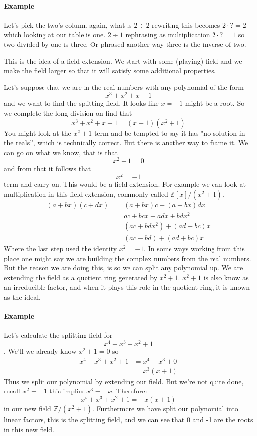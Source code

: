 \documentclass[12pt]{article}
\begin{document}
\paragraph*{Example} Let's pick the two's column again, what is $2 \div 2$ rewriting this becomes $2 \cdot ? = 2$ which looking at our table is one.   $2 \div 1$ rephrasing as multiplication $2 \cdot ? = 1$ so two divided by one is three. Or phrased another way three is the inverse of two.

This is the idea of a field extension.  We start with some (playing) field and we make the field larger so that it will satisfy some additional properties.  

Let's suppose that we are in the real numbers with any polynomial of the form $$x^3+x^2+x+1$$ and we want to find the splitting field.  It looks like $x=-1$ might be a root. So we complete the long division on find that
$$x^3+x^2+x+1 = (x+1)(x^2+1)$$ 
You might look at the $x^2+1$ term and be tempted to say it has "no solution in the reals'', which is technically correct.  But there is another way to frame it.  We can go on what we know, that is that $$x^2+1=0$$ and from that it follows that $$x^2=-1$$ term and carry on.  This would be a field extension.  For example we can look at multiplication in this field extension, commonly called $\mathbb{Z}[x]/(x^2+1)$.
\begin{align*}
(a+bx)(c+dx) & = (a+bx)c + (a+bx)dx \\
&= ac + bcx + adx +bdx^2 \\
&= (ac+bdx^2) + (ad + bc)x \\
&= (ac-bd) + (ad + bc)x
\end{align*}
Where the last step used the identity $x^2=-1$.  In some ways working from this place one might say we are building the complex numbers from the real numbers.  But the reason we are doing this, is so we can split any polynomial up.  We are extending the field as a quotient ring generated by $x^2+1$.  $x^2+1$ is also know as an irreducible factor, and when it plays this role in the quotient ring, it is known as the ideal.

\paragraph*{Example} Let's calculate the splitting field for $$x^4+x^3+x^2+1$$.  We'll we already know $x^2+1=0$ so
\begin{align*}
x^4+x^3+x^2+1 &= x^4 + x^3 + 0 \\
&= x^3(x+1)
\end{align*}
Thus we split our polynomial by extending our field.  But we're not quite done, recall $x^2=-1$ this implies $x^3 = -x$.  Therefore:
$$x^4+x^3+x^2+1 = -x(x+1)$$ in our new field $\mathbb{Z}/(x^2+1)$.  Furthermore we have split our polynomial into linear factors, this is the splitting field, and we can see that 0 and -1 are the roots in this new field.
\end{document}
